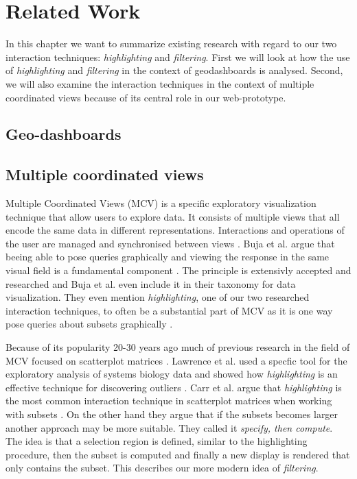 \chapter{Related Work}
In this chapter we want to summarize existing research with regard to our two interaction techniques:
\textit{highlighting} and \textit{filtering}. First we will look at how the use of \textit{highlighting}
and \textit{filtering} in the context of geodashboards is analysed. Second, we will also examine the
interaction techniques in the context of multiple coordinated views because of its central role in our web-prototype.
\section{Geo-dashboards}
\section{Multiple coordinated views}
Multiple Coordinated Views (MCV) is a specific exploratory visualization technique that allow users to explore data.
It consists of multiple views that all encode the same data in different representations. Interactions and
operations of the user are managed and synchronised between views \citep*{Roberts.722007722007}. Buja et al. argue that
beeing able to pose queries graphically and viewing the response in the same visual field is a fundamental component
\citep*{Buja.1996}. The principle is extensivly accepted and researched and Buja et al. even include it in their taxonomy
for data visualization. They even mention \textit{highlighting}, one of our two researched interaction techniques,
to often be a substantial part of MCV as it is one way pose queries about subsets graphically \citep*{Buja.1996}.

Because of its popularity 20-30 years ago much of previous research in the field of MCV focused on
scatterplot matrices \citep*{Carr.1987, Becker.1987}. Lawrence et al. used a specfic tool for the exploratory analysis of systems biology data
and showed how \textit{highlighting} is an effective technique for discovering outliers \citep*{Lawrence.2006}.
Carr et al. argue that \textit{highlighting} is the most common interaction technique in scatterplot matrices
when working with subsets \citep*{Carr.1987, Becker.1987}. On the other hand they argue that if the subsets becomes larger
another approach may be more suitable. They called it \textit{specify, then compute}.
The idea is that a selection region is defined, similar to the highlighting procedure, then the subset
is computed and finally a new display is rendered that only contains the subset. This describes our more
modern idea of \textit{filtering}.

